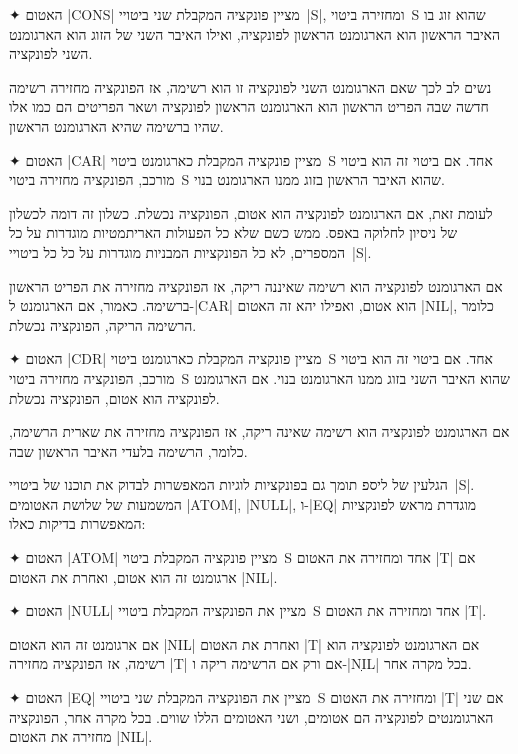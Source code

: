 \begin{enumerate}
  ✦ האטום \A|CONS| מציין פונקציה המקבלת שני ביטויי~\E|S|, ומחזירה ביטוי~S
  שהוא זוג בו האיבר הראשון הוא הארגומנט הראשון לפונקציה, ואילו האיבר השני של
  הזוג הוא הארגומנט השני לפונקציה.

  נשים לב לכך שאם הארגומנט השני לפונקציה זו הוא רשימה, אז הפונקציה מחזירה
  רשימה חדשה שבה הפריט הראשון הוא הארגומנט הראשון לפונקציה ושאר
  הפריטים הם כמו אלו שהיו ברשימה שהיא הארגומנט הראשון.

  ✦ האטום \A|CAR| מציין פונקציה המקבלת כארגומנט ביטוי~S אחד. אם ביטוי זה הוא
  ביטוי מורכב, הפונקציה מחזירה ביטוי~S שהוא האיבר הראשון בזוג ממנו הארגומנט
  בנוי. 

  לעומת זאת, אם הארגומנט לפונקציה הוא אטום, הפונקציה נכשלת. כשלון זה דומה
  לכשלון של ניסיון לחלוקה באפס. ממש כשם שלא כל הפעולות האריתמטיות מוגדרות על כל
  המספרים, לא כל הפונקציות המבניות מוגדרות על כל כל ביטויי~\E|S|.

  אם הארגומנט לפונקציה הוא רשימה שאיננה ריקה, אז הפונקציה מחזירה את הפריט
  הראשון ברשימה. כאמור, אם הארגומנט ל-\E|CAR| הוא אטום, ואפילו יהא זה
  האטום \A|NIL|, כלומר הרשימה הריקה, הפונקציה נכשלת.

  ✦ האטום \A|CDR| מציין פונקציה המקבלת כארגומנט ביטוי~S אחד. אם ביטוי זה הוא
  ביטוי מורכב, הפונקציה מחזירה ביטוי~S שהוא האיבר השני בזוג ממנו הארגומנט בנוי.
  אם הארגומנט לפונקציה הוא אטום, הפונקציה נכשלת.

  אם הארגומנט לפונקציה הוא רשימה שאינה ריקה, אז הפונקציה מחזירה את
  שארית הרשימה, כלומר, הרשימה בלעדי האיבר הראשון שבה.
\end{enumerate}


הגלעין של ליספ תומך גם בפונקציות לוגיות המאפשרות לבדוק את תוכנו של
ביטויי~\E|S|.  המשמעות של שלושת האטומים \A|ATOM|, \A|NULL|, ו-\A|EQ| מוגדרת
מראש לפונקציות המאפשרות בדיקות כאלו: 

\begin{enumerate}
  ✦ האטום \A|ATOM| מציין פונקציה המקבלת ביטוי~S אחד ומחזירה את האטום \A|T| אם
  ארגומנט זה הוא אטום, ואחרת את האטום \A|NIL|.

  ✦ האטום \A|NULL| מציין את הפונקציה המקבלת ביטויי~S אחד ומחזירה את האטום
  \A|T|.

  אם ארגומנט זה הוא האטום \A|NIL| ואחרת את האטום \A|T| אם הארגומנט לפונקציה הוא
  רשימה, אז הפונקציה מחזירה \A|T| אם ורק אם הרשימה ריקה ו-\A|NִִIL| בכל
  מקרה אחר.

  ✦ האטום \A|EQ| מציין את הפונקציה המקבלת שני ביטויי~S ומחזירה את האטום \A|T|
  אם שני הארגומנטים לפונקציה הם אטומים, ושני האטומים הללו שווים. בכל מקרה אחר,
  הפונקציה מחזירה את האטום \A|NIL|. 
  \end{enumerate}

